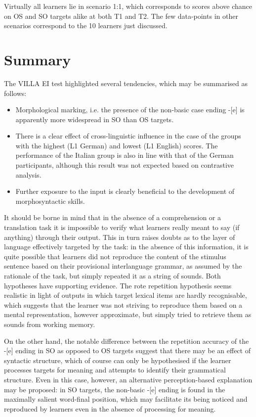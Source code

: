 Virtually all learners lie in scenario 1:1, which corresponds to scores above chance on OS and SO targets alike at both T1 and T2. The few data-points in other scenarios correspond to the 10 learners just discussed.

\section{Summary}\label{sec:04:3}

The VILLA EI test highlighted several tendencies, which may be summarised as follows:

\begin{itemize}
    \item Morphological marking, i.e. the presence of the non-basic case ending -[e] is apparently more widespread in SO than OS targets.
    \item There is a clear effect of cross-linguistic influence in the case of the groups with the highest (L1 German) and lowest (L1 English) scores. The performance of the Italian group is also in line with that of the German participants, although this result was not expected based on contrastive analysis.
    \item Further exposure to the input is clearly beneficial to the development of morphosyntactic skills.
\end{itemize}

It should be borne in mind that in the absence of a comprehension or a translation task it is impossible to verify what learners really meant to say (if anything) through their output. This in turn raises doubts as to the layer of language effectively targeted by the task: in the absence of this information, it is quite possible that learners did not reproduce the content of the stimulus sentence based on their provisional interlanguage grammar, as assumed by the rationale of the task, but simply repeated it as a string of sounds. Both hypotheses have supporting evidence. The rote repetition hypothesis seems realistic in light of outputs in which target lexical items are hardly recognisable, which suggests that the learner was not striving to reproduce them based on a mental representation, however approximate, but simply tried to retrieve them as sounds from working memory.

On the other hand, the notable difference between the repetition accuracy of the -[e] ending in SO as opposed to OS targets suggest that there may be an effect of syntactic structure, which of course can only be hypothesised if the learner processes targets for meaning and attempts to identify their grammatical structure. Even in this case, however, an alternative perception-based explanation may be proposed: in SO targets, the non-basic -[e] ending is found in the maximally salient word-final position, which may facilitate its being noticed and reproduced by learners even in the absence of processing for meaning.

